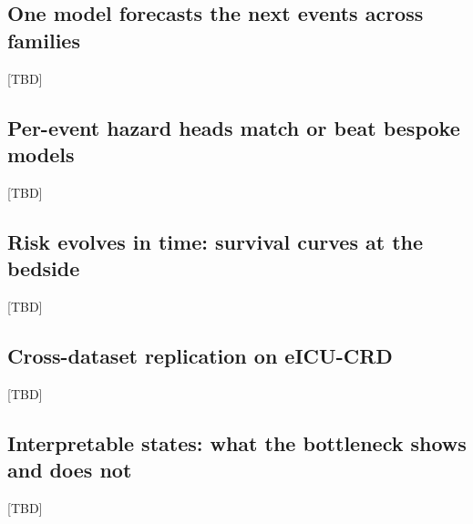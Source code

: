 \documentclass[pdflatex,sn-nature]{sn-jnl}
\begin{document}
\subsection{One model forecasts the next events across families}\label{sec:res-forecast}
[TBD]

\subsection{Per-event hazard heads match or beat bespoke models}\label{sec:res-alerts}
[TBD]

\subsection{Risk evolves in time: survival curves at the bedside}\label{sec:res-time}
[TBD]

\subsection{Cross-dataset replication on eICU-CRD}\label{sec:res-eicu}
[TBD]

\subsection{Interpretable states: what the bottleneck shows and does not}\label{sec:res-concepts}
[TBD]
\end{document}
